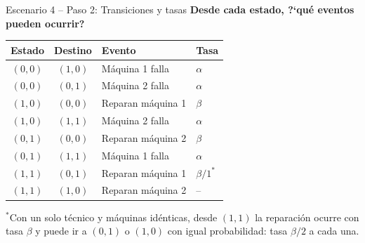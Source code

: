 \documentclass[aspectratio=1610, 9pt]{beamer}
\begin{document}
\begin{frame}{Escenario 4 -- Paso 2: Transiciones y tasas}
\textbf{Desde cada estado, ?`qu\'e eventos pueden ocurrir?}

\vspace{4pt}
\renewcommand{\arraystretch}{1.35}
\footnotesize
\begin{tabular}{ccll}
\toprule
\textbf{Estado} & \textbf{Destino} & \textbf{Evento} & \textbf{Tasa} \\
\midrule
$(0,0)$ & $(1,0)$ & M\'aquina 1 falla & $\alpha$ \\
$(0,0)$ & $(0,1)$ & M\'aquina 2 falla & $\alpha$ \\
\midrule
$(1,0)$ & $(0,0)$ & Reparan m\'aquina 1 & $\beta$ \\
$(1,0)$ & $(1,1)$ & M\'aquina 2 falla & $\alpha$ \\
\midrule
$(0,1)$ & $(0,0)$ & Reparan m\'aquina 2 & $\beta$ \\
$(0,1)$ & $(1,1)$ & M\'aquina 1 falla & $\alpha$ \\
\midrule
$(1,1)$ & $(0,1)$ & Reparan m\'aquina 1 & $\beta/1^{*}$ \\
$(1,1)$ & $(1,0)$ & Reparan m\'aquina 2 & -- \\
\bottomrule
\end{tabular}

\vspace{4pt}
\normalsize
$^{*}$Con un solo t\'ecnico y m\'aquinas id\'enticas, desde $(1,1)$ la reparaci\'on ocurre con tasa $\beta$ y puede ir a $(0,1)$ o $(1,0)$ con igual probabilidad: tasa $\beta/2$ a cada una.
\end{frame}
\end{document}
